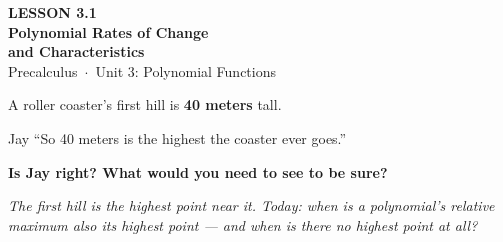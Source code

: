 \documentclass[aspectratio=169, 11pt]{beamer}
\begin{document}
{
\begin{frame}[plain]
  \vspace{2.6cm}\hspace{0.55cm}%
  \begin{minipage}{0.9\textwidth}
    {\color{goldacc}\bfseries\small LESSON 3.1}\\[0.5cm]
    {\color{white}\bfseries\Large Polynomial Rates of Change}\\[0.2cm]
    {\color{white}\bfseries\Large and Characteristics}\\[1.0cm]
    {\color{lilacmid}\small Precalculus~$\cdot$~Unit 3: Polynomial Functions}
  \end{minipage}
\end{frame}
}

\begin{frame}[t, plain]

  A roller coaster's first hill is \textbf{40 meters} tall.

  \bigskip
  \begin{block}{Jay}
    ``So 40 meters is the highest the coaster ever goes.''
  \end{block}

  \bigskip
  \begin{center}
    {\Large\bfseries\color{plum} Is Jay right? What would you need to see to be sure?}
  \end{center}

  \medskip
  \textit{The first hill is the highest point \emph{near it}. Today: when is a polynomial's
  relative maximum also its highest point --- and when is there no highest point at all?}
\end{frame}
\end{document}

